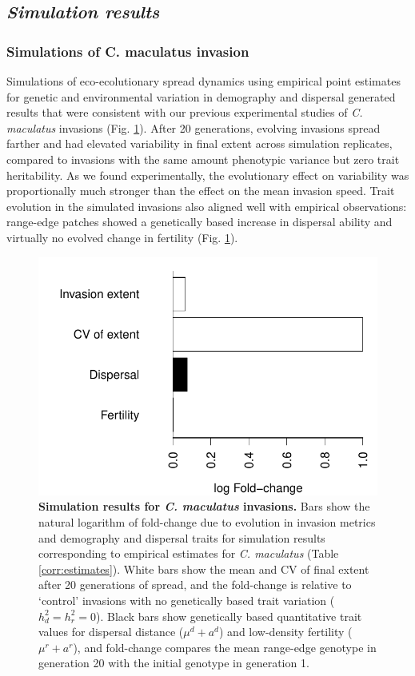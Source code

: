 \documentclass[11pt]{article}
\begin{document}
\newpage
\subsection*{\textit{Simulation results}}
\subsubsection*{Simulations of \textup{C. maculatus} invasion}
Simulations of eco-ecolutionary spread dynamics using empirical point estimates for genetic and environmental variation in demography and dispersal generated results that were consistent with our previous experimental studies of \textit{C. maculatus} invasions (Fig. \ref{corr:barplot}).
After 20 generations, evolving invasions spread farther and had elevated variability in final extent across simulation replicates, compared to invasions with the same amount phenotypic variance but zero trait heritability.
As we found experimentally, the evolutionary effect on variability was proportionally much stronger than the effect on the mean invasion speed.
Trait evolution in the simulated invasions also aligned well with empirical observations: range-edge patches showed a genetically based increase in dispersal ability and virtually no evolved change in fertility (Fig. \ref{corr:barplot}).

\begin{figure}[h!]
\centering
\includegraphics[width=0.5\linewidth]{Figures/foldchange_barplot}
\caption{\textbf{Simulation results for \textit{C. maculatus} invasions.} Bars show the natural logarithm of fold-change due to evolution in invasion metrics and demography and dispersal traits for simulation results corresponding to empirical estimates for \textit{C. maculatus} (Table \ref{corr:estimates}).
White bars show the mean and CV of final extent after 20 generations of spread, and the fold-change is relative to `control' invasions with no genetically based trait variation ($h^{2}_{d} = h^{2}_{r} = 0$).
Black bars show genetically based quantitative trait values for dispersal distance ($\mu^{d} + a^{d}$) and low-density fertility ($\mu^{r} + a^{r}$), and fold-change compares the mean range-edge genotype in generation 20 with the initial genotype in generation 1.}
\label{corr:barplot}
\end{figure}
\end{document}
